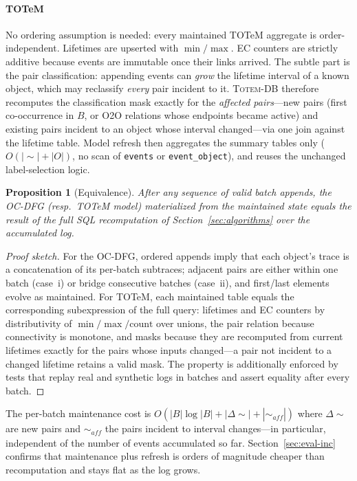 \documentclass[sigconf, nonacm]{acmart}
\newtheorem{proposition}{Proposition}
\newcommand{\sys}{\textsc{Totem-DB}\xspace}
\begin{document}
\paragraph{TOTeM} No ordering assumption is needed: every maintained TOTeM aggregate is order-independent. Lifetimes are upserted with $\min/\max$. EC counters are strictly additive because events are immutable once their links arrived. The subtle part is the pair classification: appending events can \emph{grow} the lifetime interval of a known object, which may reclassify \emph{every} pair incident to it. \sys therefore recomputes the classification mask exactly for the \emph{affected pairs}---new pairs (first co-occurrence in $B$, or O2O relations whose endpoints became active) and existing pairs incident to an object whose interval changed---via one join against the lifetime table. Model refresh then aggregates the summary tables only ($O(|{\sim}| + |O|)$, no scan of \texttt{events} or \texttt{event\_object}), and reuses the unchanged label-selection logic.

\begin{proposition}[Equivalence]
\label{prop:equiv}
After any sequence of valid batch appends, the OC-DFG (resp.\ TOTeM model) materialized from the maintained state equals the result of the full SQL recomputation of Section~\ref{sec:algorithms} over the accumulated log.
\end{proposition}

\begin{proof}[Proof sketch]
For the OC-DFG, ordered appends imply that each object's trace is a concatenation of its per-batch subtraces; adjacent pairs are either within one batch (case~i) or bridge consecutive batches (case~ii), and first/last elements evolve as maintained. For TOTeM, each maintained table equals the corresponding subexpression of the full query: lifetimes and EC counters by distributivity of $\min/\max/\mathrm{count}$ over unions, the pair relation because connectivity is monotone, and masks because they are recomputed from current lifetimes exactly for the pairs whose inputs changed---a pair not incident to a changed lifetime retains a valid mask. The property is additionally enforced by tests that replay real and synthetic logs in batches and assert equality after every batch.
\end{proof}

The per-batch maintenance cost is $O(|B|\log|B| + |\Delta{\sim}| + |{\sim_{\mathit{aff}}}|)$ where $\Delta{\sim}$ are new pairs and ${\sim_{\mathit{aff}}}$ the pairs incident to interval changes---in particular, independent of the number of events accumulated so far. Section~\ref{sec:eval-inc} confirms that maintenance plus refresh is orders of magnitude cheaper than recomputation and stays flat as the log grows.
\end{document}
